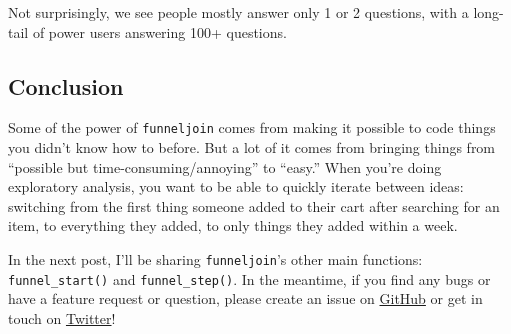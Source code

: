 \documentclass[]{article}
\begin{document}
Not surprisingly, we see people mostly answer only 1 or 2 questions,
with a long-tail of power users answering 100+ questions.

\subsection{Conclusion}\label{conclusion}

Some of the power of \texttt{funneljoin} comes from making it possible
to code things you didn't know how to before. But a lot of it comes from
bringing things from ``possible but time-consuming/annoying'' to
``easy.'' When you're doing exploratory analysis, you want to be able to
quickly iterate between ideas: switching from the first thing someone
added to their cart after searching for an item, to everything they
added, to only things they added within a week.

In the next post, I'll be sharing \texttt{funneljoin}'s other main
functions: \texttt{funnel\_start()} and \texttt{funnel\_step()}. In the
meantime, if you find any bugs or have a feature request or question,
please create an issue on
\href{https://github.com/robinsones/funneljoin}{GitHub} or get in touch
on \href{https://twitter.com/robinson_es}{Twitter}!
\end{document}
